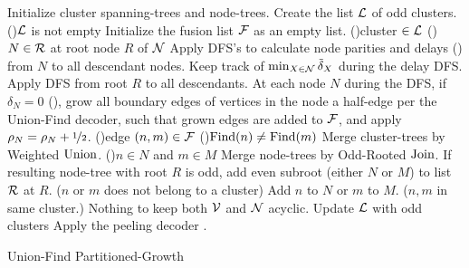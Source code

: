 \begin{algorithm}[h!]
  \BlankLine
  \BlankLine
  Initialize cluster spanning-trees and node-trees.\;\label{algo:B1a}%
  Create the list $\mathcal{L}$ of odd clusters.\;
  \While(){$\mathcal{L}$ is not empty}{
    Initialize the fusion list $\mathcal{F}$ as an empty list.\;\label{algo:B1b}
    \For(){cluster $\in\mathcal{L}$ \label{algo:B2a}}{
      \For(){$N \in\mathcal{R}$ at root node $R$ of $\mathcal{N}$}{
        Apply DFS's to calculate node parities and delays () from $N$ to all descendant nodes. Keep track of $\min_{X \in \mathcal{N}}{\tilde{\delta}_X}$ during the delay DFS.\;\label{algo:pdc}
      }
      Apply DFS from root $R$ to all descendants. At each node $N$ during the DFS, if $\delta_N=0$ (), grow all boundary edges of vertices in the node a half-edge per the Union-Find decoder, such that grown edges are added to $\mathcal{F}$, and apply $\rho_N=\rho_N +\nicefrac{1}{2}$. \;\label{algo:grow}
    }
    \For(){edge $(n,m) \in \mathcal{F}$\label{algo:B3a}}{
      \eIf(){$\operatorname{Find}(n)\neq\operatorname{Find}(m)$}{
        Merge cluster-trees by Weighted $\operatorname{Union}$.\;
        \eIf(){$n \in N$ and $m \in M$\label{algo:joina}}{
          Merge node-trees by Odd-Rooted $\operatorname{Join}$. If resulting node-tree with root $R$ is odd, add even subroot (either $N$ or $M$) to list $\mathcal{R}$ at $R$.\;
        }($n$ or $m$ does not belong to a cluster){
          Add $n$ to $N$ or $m$ to $M$.\;\label{algo:joinb}
        }
      }($n,m$ in same cluster.\label{algo:dfa}){
        Nothing to keep both $\mathcal{V}$ and $\mathcal{N}$ acyclic.\;\label{algo:dfb} 
      }
    }
    Update $\mathcal{L}$ with odd clusters\; \label{algo:B3b}
  }
  Apply the peeling decoder \cite{delfosse2017linear}.\label{algo:B4a}
  \caption{Union-Find Partitioned-Growth}\label{algo:ufbb}
\end{algorithm}